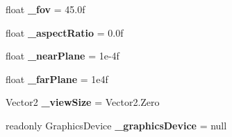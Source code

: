 \begin{DoxyCompactItemize}
float {\bfseries \+\_\+fov} = 45.\+0f
\item 
\mbox{\label{class_n_g_sim_1_1_graphics_1_1_camera_ac4e9ce783e9ed626c0838ceff7689c7c}} 
float {\bfseries \+\_\+aspect\+Ratio} = 0.\+0f
\item 
\mbox{\label{class_n_g_sim_1_1_graphics_1_1_camera_a6778a6fa771e65a49b7432ed22143c70}} 
float {\bfseries \+\_\+near\+Plane} = 1e-\/4f
\item 
\mbox{\label{class_n_g_sim_1_1_graphics_1_1_camera_a60db9fff51efd267ed4dc9a606edb8f5}} 
float {\bfseries \+\_\+far\+Plane} = 1e4f
\item 
\mbox{\label{class_n_g_sim_1_1_graphics_1_1_camera_a65426d3565426dfbbcac6bd00b0eae95}} 
Vector2 {\bfseries \+\_\+view\+Size} = Vector2.\+Zero
\item 
\mbox{\label{class_n_g_sim_1_1_graphics_1_1_camera_add1eb011b26844b4799b64c1614722e8}} 
readonly Graphics\+Device {\bfseries \+\_\+graphics\+Device} = null
\end{DoxyCompactItemize}
